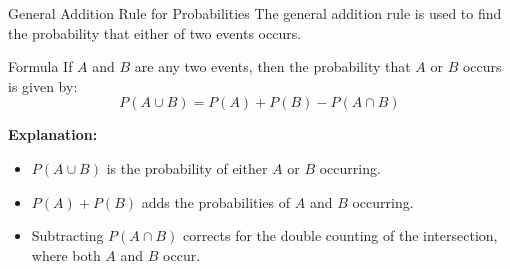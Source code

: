 \documentclass[handout]{beamer} %
\begin{document}
\begin{frame}{General Addition Rule for Probabilities}
    The general addition rule is used to find the probability that either of two events occurs.\pause

    \begin{block}{Formula}
        If \(A\) and \(B\) are any two events, then the probability that \(A\) or \(B\) occurs is given by:\pause
        \[
        P(A \cup B) = P(A) + P(B) - P(A \cap B)
        \]\pause
    \end{block}

    \textbf{Explanation:}\pause
    \begin{itemize}
        \item \(P(A \cup B)\) is the probability of either \(A\) or \(B\) occurring.\pause
        \item \(P(A) + P(B)\) adds the probabilities of \(A\) and \(B\) occurring.\pause
        \item Subtracting \(P(A \cap B)\) corrects for the double counting of the intersection, where both \(A\) and \(B\) occur.
    \end{itemize}
\end{frame}
\end{document}

